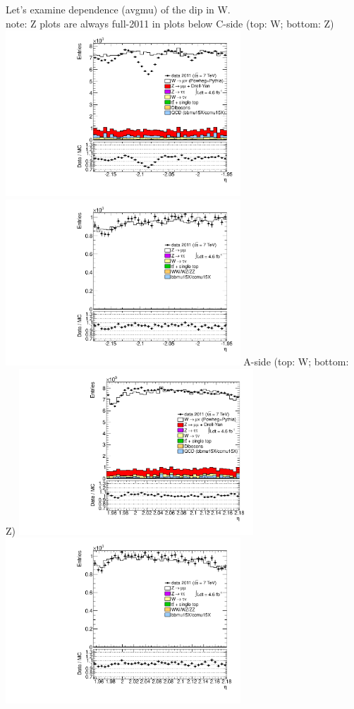  {
Let's examine dependence  (avgmu) of the dip in W. \\
\small{ note: Z plots are always full-2011 in plots below }
}
 {
\colb[T]
C-side (top: W; bottom: Z)
\centering
\includegraphics[width=0.66\textwidth]{dates/20130306/figures/both/W_10_C_stack_l_eta_NEG} \\
\includegraphics[width=0.66\textwidth]{dates/20130306/figures/both/Z_10_C_stack_lN_eta_ALL.pdf}
A-side (top: W; bottom: Z)
\centering
\includegraphics[width=0.66\textwidth]{dates/20130306/figures/both/W_10_A_stack_l_eta_NEG} \\
\includegraphics[width=0.66\textwidth]{dates/20130306/figures/both/Z_10_A_stack_lN_eta_ALL.pdf} 
\cole
}
